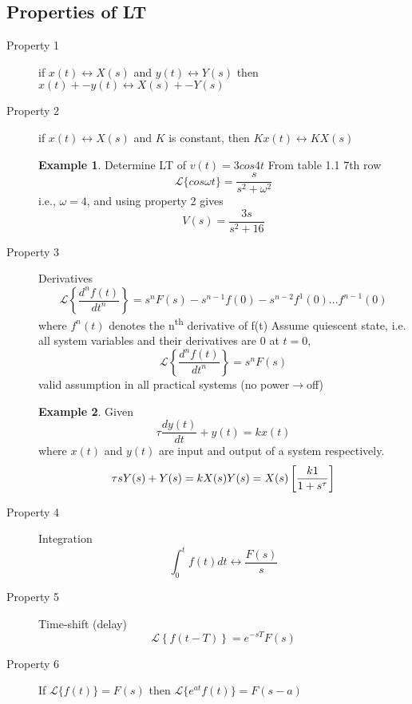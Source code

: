 \documentclass[11pt]{article} %
\theoremstyle{definition}
\newtheorem{example}{Example}[subsection]
\begin{document}
\subsection{Properties of LT}
	\begin{description}
		\item[Property 1] if $x(t)\leftrightarrow X(s)$ and $y(t)\leftrightarrow Y(s)$ then $x(t)+-y(t) \leftrightarrow X(s)+- Y(s)$
		\item[Property 2] if $x(t)\leftrightarrow X(s)$  and $K$ is constant, then $Kx(t)\leftrightarrow KX(s)$
			\begin{example}
				Determine LT of $v(t) = 3cos4t$
				From table 1.1 7th row
					\begin{equation}
						\mathcal{L}\{cos\omega t\} = \frac{s}{s^2+\omega^2}
					\end{equation}
				i.e., $\omega=4$, and using property 2 gives
					\begin{equation}
						 V(s) =  \frac{3s}{s^2+16}
					\end{equation}
			\end{example}
		\item[Property 3] Derivatives
			\begin{equation}
				\mathcal{L}\left\{\frac{d^nf(t)}{dt^n}\right\} = s^n  F(s) -s^{n-1}f(0)-s^{n-2}f^1(0)  ...  f^{n-1}(0)
			\end{equation}
			where $f^n(t)$ denotes the n\textsuperscript{th} derivative of f(t)
			Assume quiescent state, i.e. all system variables and their derivatives are 0 at $t=0$,
			\begin{equation}
				\mathcal{L}\left\{\frac{d^nf(t)}{dt^n}\right\}  = s^nF(s)
			\end{equation}
			valid assumption in all practical systems (no power$\rightarrow$off)
			\begin{example}	
				Given $$\tau \frac{dy(t)}{dt}+y(t) = kx(t)$$  where $x(t)$ and $y(t)$ are input and output of a system respectively.
				\begin{equation}
					\tau s Y(s) + Y(s) = kX(s) \\
					Y(s) = X(s)\left[\frac{k1}{1+s^\tau }\right]
			\end{equation}
	\end{example}
		\item[Property 4] Integration
			\begin{equation}
				\int^t_0f(t)dt\leftrightarrow \frac{F(s)}{s}
			\end{equation}
		\item[Property 5] Time-shift (delay)
			\begin{equation}
				\mathcal{L}\left\{f(t-T)\right\}=e^{-sT}F(s)
			\end{equation}
		\item[Property 6]
			If $\mathcal{L}\{f(t)\}=F(s)$
			then $\mathcal{L}\{e^{at}f(t)\} = F(s-a)$
	\end{description}
\end{document}
